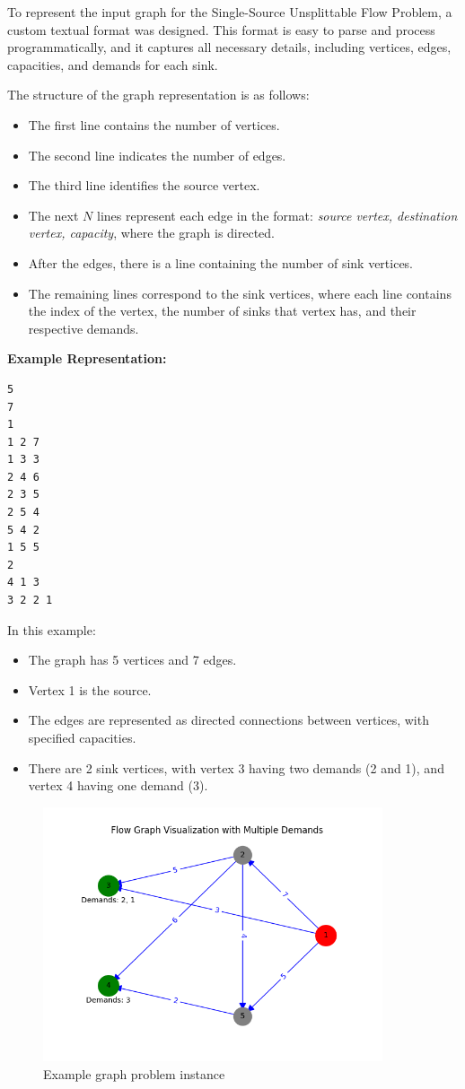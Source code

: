 \documentclass[a4paper,12pt]{article}
\begin{document}
To represent the input graph for the Single-Source Unsplittable Flow Problem, a custom textual format was designed. This format is easy to parse and process programmatically, and it captures all necessary details, including vertices, edges, capacities, and demands for each sink.

\noindent The structure of the graph representation is as follows:

\begin{itemize}
    \item The first line contains the number of vertices.
    \item The second line indicates the number of edges.
    \item The third line identifies the source vertex.
    \item The next \(N\) lines represent each edge in the format: \textit{source vertex, destination vertex, capacity}, where the graph is directed.
    \item After the edges, there is a line containing the number of sink vertices.
    \item The remaining lines correspond to the sink vertices, where each line contains the index of the vertex, the number of sinks that vertex has, and their respective demands.
\end{itemize}

\noindent \textbf{Example Representation:}

\begin{verbatim}
5
7
1
1 2 7
1 3 3
2 4 6
2 3 5
2 5 4
5 4 2
1 5 5
2
4 1 3
3 2 2 1
\end{verbatim}

\noindent In this example:
\begin{itemize}
    \item The graph has 5 vertices and 7 edges.
    \item Vertex 1 is the source.
    \item The edges are represented as directed connections between vertices, with specified capacities.
    \item There are 2 sink vertices, with vertex 3 having two demands (2 and 1), and vertex 4 having one demand (3).
\end{itemize}

\begin{figure}[H]
\centering
\includegraphics[width=100mm]{graph-1.png}
\caption{Example graph problem instance}
\label{fig:graph_example}
\end{figure}
\end{document}
